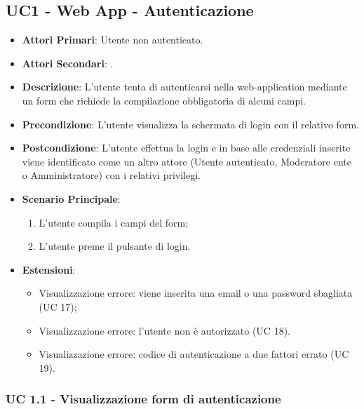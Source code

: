 	\subsection{UC1 - Web App - Autenticazione}
		
		
	\begin{itemize}
		\item \textbf{Attori Primari}: Utente non autenticato.
		\item \textbf{Attori Secondari}: .
		\item \textbf{Descrizione}: L'utente tenta di autenticarsi nella web-application mediante un form che richiede la compilazione obbligatoria di alcuni campi.
		\item \textbf{Precondizione}: L'utente visualizza la schermata di login con il relativo form.
		\item \textbf{Postcondizione}: L'utente effettua la login e in base alle credenziali inserite viene identificato come un altro attore (Utente autenticato, Moderatore ente o Amministratore) con i relativi privilegi.
		\item \textbf{Scenario Principale}:
		\begin{enumerate}
			\item L'utente compila i campi del form;
			\item L'utente preme il pulsante di login.
		\end{enumerate}
		\item \textbf{Estensioni}:
			\begin{itemize}
				\item Visualizzazione errore: viene inserita una email o una password sbagliata (UC 17);
				\item Visualizzazione errore: l'utente non è autorizzato (UC 18).
				\item Visualizzazione errore: codice di autenticazione a due fattori errato (UC 19).
			\end{itemize}
	\end{itemize}
	

		\subsubsection{UC 1.1 - Visualizzazione form di autenticazione}

